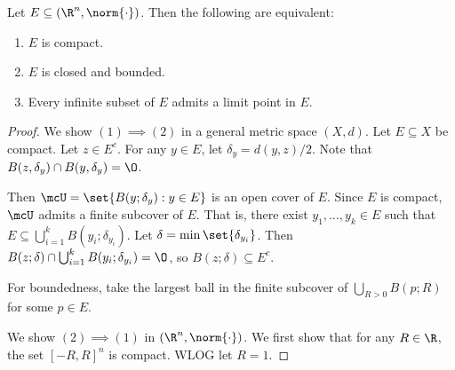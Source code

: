 \begin{theorem} \label{thm:compactness}
    Let $E \subseteq (\R^n, \norm{\cdot})$.
    Then the following are equivalent:
    \begin{enumerate}[label=(\arabic*)]
        \item $E$ is compact.
        \item $E$ is closed and bounded.
        \item Every infinite subset of $E$ admits a limit point in $E$.
    \end{enumerate}
\end{theorem}
\begin{proof}
    We show $(1) \implies (2)$ in a general metric space $(X, d)$.
    Let $E \subseteq X$ be compact.
    Let $z \in E^c$.
    For any $y \in E$, let $\delta_y = d(y, z) / 2$.
    Note that $B(z, \delta_y) \cap B(y, \delta_y) = \O$.

    Then $\mcU = \set{B(y; \delta_y) : y \in E}$ is an open cover of $E$.
    Since $E$ is compact, $\mcU$ admits a finite subcover of $E$.
    That is, there exist $y_1, \dots, y_k \in E$ such that
    $E \subseteq \bigcup_{i = 1}^k B(y_i; \delta_{y_i})$.
    Let $\delta = \min\set{\delta_{y_i}}$.
    Then $B(z; \delta) \cap \bigcup_{i = 1}^k B(y_i; \delta_{y_i}) = \O$,
    so $B(z; \delta) \subseteq E^c$.

    For boundedness, take the largest ball in the finite subcover of
    $\bigcup_{R > 0} B(p; R)$ for some $p \in E$.

    We show $(2) \implies (1)$ in $(\R^n, \norm{\cdot})$.
    We first show that for any $R \in \R$, the set $[-R, R]^n$ is compact.
    WLOG let $R = 1$.
\end{proof}
